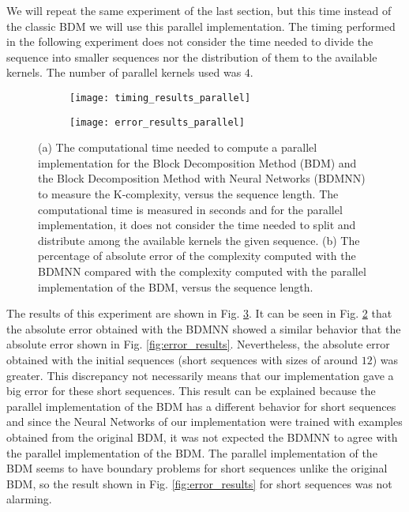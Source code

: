 We will repeat the same experiment of the last section, but this time instead of the classic BDM we will use this parallel implementation. The timing performed in the following experiment does not consider the time needed to divide the sequence into smaller sequences nor the distribution of them to the available kernels. The number of parallel kernels used was $4$.\\

\begin{figure}
	\centering
	\begin{subfigure}[b]{0.8\textwidth}
		\centering
		\texttt{[image: timing\_results\_parallel]}
		\caption{}
		\label{fig:timing_results_parallel}
	\end{subfigure}
	\hspace{0.001mm}
	\begin{subfigure}[b]{0.8\textwidth}
		\centering
		\texttt{[image: error\_results\_parallel]}
		\caption{}
		\label{fig:error_results_parallel}
	\end{subfigure}
	\caption[Computational time and absolute error obtained with the BDMNN versus a parallel implementation of the BDM.]{(a) The computational time needed to compute a parallel implementation for the Block Decomposition Method (BDM) and the Block Decomposition Method with Neural Networks (BDMNN) to measure the K-complexity, versus the sequence length. The computational time is measured in seconds and for the parallel implementation, it does not consider the time needed to split and distribute among the available kernels the given sequence. (b) The percentage of absolute error of the complexity computed with the BDMNN compared with the complexity computed with the parallel implementation of the BDM, versus the sequence length.}
	\label{fig:tim_error_results_parallel}
\end{figure}

The results of this experiment are shown in Fig. \ref{fig:tim_error_results_parallel}. It can be seen in Fig. \ref{fig:error_results_parallel} that the absolute error obtained with the BDMNN showed a similar behavior that the absolute error shown in Fig. \ref{fig:error_results}. Nevertheless, the absolute error obtained with the initial sequences (short sequences with sizes of around $12$) was greater. This discrepancy not necessarily means that our implementation gave a big error for these short sequences. This result can be explained because the parallel implementation of the BDM has a different behavior for short sequences and since the Neural Networks of our implementation were trained with examples obtained from the original BDM, it was not expected the BDMNN to agree with the parallel implementation of the BDM. The parallel implementation of the BDM seems to have boundary problems for short sequences unlike the original BDM, so the result shown in Fig. \ref{fig:error_results} for short sequences was not alarming.\\

